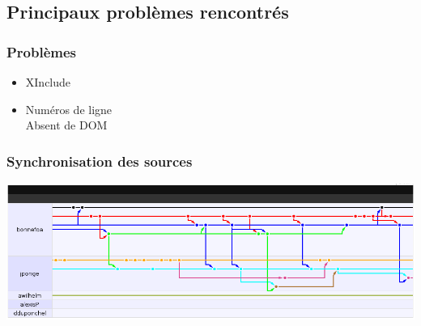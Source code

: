 \subsection{Principaux problèmes rencontrés}
\begin{frame}\frametitle{Problèmes}
\begin{itemize}
 \item XInclude
 \item Numéros de ligne\\ Absent de DOM
\end{itemize}
\end{frame}
\begin{frame}\frametitle{Synchronisation des sources}
\includegraphics[width=\linewidth]{../image/gitHubBranche.png}
\end{frame}